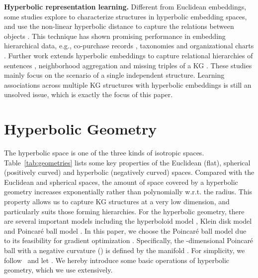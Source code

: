 \documentclass[11pt,a4paper]{article}
\begin{document}
\noindent\textbf{Hyperbolic representation learning.}
Different from Euclidean embeddings, some studies explore to characterize structures in hyperbolic embedding spaces, and use the non-linear hyperbolic distance to capture the relations between objects \cite{NickelK17,sala2018representation}. This technique has shown promising performance in embedding hierarchical data, e.g., co-purchase records \cite{vinh2018hyperbolic}, taxonomies \cite{le2019inferring,aly2019every} and organizational charts \cite{chen2019edge}. Further work extends hyperbolic embeddings to capture relational hierarchies of sentences \cite{HyperText}, neighborhood aggregation \cite{HGCNN,HGCN} and missing triples of a KG \cite{HyperKG,PoincareKG}. These studies mainly focus on the scenario of a single independent structure. Learning associations across multiple KG structures with hyperbolic embeddings is still an unsolved issue, which is exactly the focus of this paper.
 \section{Hyperbolic Geometry}


The hyperbolic space is one of the three kinds of isotropic spaces. Table~\ref{tab:geometries} lists some key properties of the Euclidean (flat), spherical (positively curved) and hyperbolic (negatively curved) spaces. Compared with the Euclidean and spherical spaces, the amount of space covered by a hyperbolic geometry increases exponentially rather than polynomially w.r.t. the radius. This property allows us to capture KG structures at a very low dimension, and particularly suits those forming hierarchies. For the hyperbolic geometry, there are several important models including the hyperboloid model \cite{reynolds1993hyperbolic}, Klein disk model \cite{nielsen2014visualizing} and Poincar\'e ball model \cite{cannon1997hyperbolic}. In this paper, we choose the Poincar\'e ball model due to its feasibility for gradient optimization \cite{PoincareKG}. Specifically, the -dimensional Poincar\'e ball with a negative curvature  () is defined by the manifold . For simplicity, we follow~\cite{HNN} and let . We hereby introduce some basic operations of hyperbolic geometry, which we use extensively.
\end{document}
